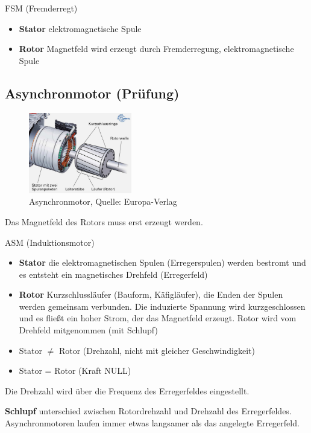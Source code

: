 FSM (Fremderregt)

\begin{itemize}
\item
  \textbf{Stator} elektromagnetische Spule
\item
  \textbf{Rotor} Magnetfeld wird erzeugt durch Fremderregung,
  elektromagnetische Spule
\end{itemize}

\subsection{Asynchronmotor (Prüfung)}\label{asynchronmotor-pruefung}

\begin{figure}[!ht]%
\centering
\includegraphics[width=0.4\textwidth]{images/HV/HV-5.pdf}
\caption{Asynchronmotor, Quelle: Europa-Verlag}
\end{figure}

Das Magnetfeld des Rotors muss erst erzeugt werden.

ASM (Induktionsmotor)

\begin{itemize}
\item
  \textbf{Stator} die elektromagnetischen Spulen (Erregerspulen) werden
  bestromt und es entsteht ein magnetisches Drehfeld (Erregerfeld)
\item
  \textbf{Rotor} Kurzschlussläufer (Bauform, Käfigläufer), die Enden der
  Spulen werden gemeinsam verbunden. Die induzierte Spannung wird
  kurzgeschlossen und es fließt ein hoher Strom, der das Magnetfeld
  erzeugt. Rotor wird vom Drehfeld mitgenommen (mit Schlupf)
\item
  Stator $\neq$ Rotor (Drehzahl, nicht mit gleicher Geschwindigkeit)
\item
  Stator = Rotor (Kraft NULL)
\end{itemize}

Die Drehzahl wird über die Frequenz des Erregerfeldes eingestellt.

\textbf{Schlupf} unterschied zwischen Rotordrehzahl und Drehzahl des
Erregerfeldes. Asynchronmotoren laufen immer etwas langsamer als das
angelegte Erregerfeld.

